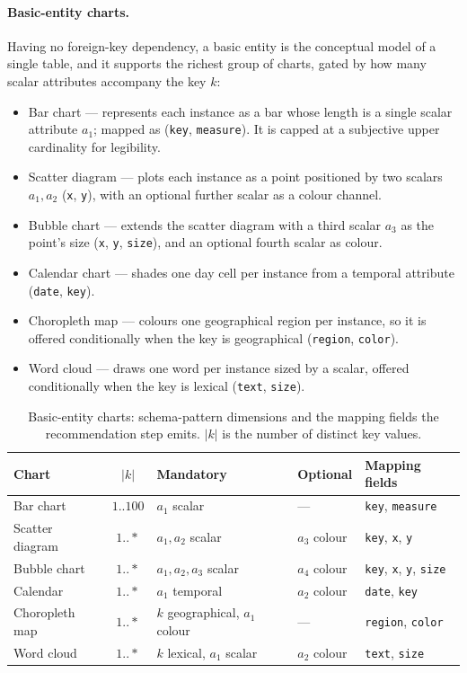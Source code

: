 \paragraph{Basic-entity charts.} Having no foreign-key dependency, a basic entity is the conceptual model of a single table, and it supports the richest group of charts, gated by how many scalar attributes accompany the key $k$:
\begin{itemize}
  \item Bar chart --- represents each instance as a bar whose length is a single scalar attribute $a_1$; mapped as (\texttt{key}, \texttt{measure}). It is capped at a subjective upper cardinality for legibility.
  \item Scatter diagram --- plots each instance as a point positioned by two scalars $a_1,a_2$ (\texttt{x}, \texttt{y}), with an optional further scalar as a colour channel.
  \item Bubble chart --- extends the scatter diagram with a third scalar $a_3$ as the point's size (\texttt{x}, \texttt{y}, \texttt{size}), and an optional fourth scalar as colour.
  \item Calendar chart --- shades one day cell per instance from a temporal attribute (\texttt{date}, \texttt{key}).
  \item Choropleth map --- colours one geographical region per instance, so it is offered conditionally when the key is geographical (\texttt{region}, \texttt{color}).
  \item Word cloud --- draws one word per instance sized by a scalar, offered conditionally when the key is lexical (\texttt{text}, \texttt{size}).
\end{itemize}

\begin{table}[htbp]
\centering
\caption{Basic-entity charts: schema-pattern dimensions and the mapping fields the recommendation step emits. $|k|$ is the number of distinct key values.}
\label{tab:step2-basic}
\small
\renewcommand{\arraystretch}{1.25}
\begin{tabular}{@{}lclll@{}}
\toprule
\textbf{Chart} & \textbf{$|k|$} & \textbf{Mandatory} & \textbf{Optional} & \textbf{Mapping fields} \\
\midrule
Bar chart & $1..100$ & $a_1$ scalar & --- & \texttt{key}, \texttt{measure} \\
Scatter diagram & $1..*$ & $a_1,a_2$ scalar & $a_3$ colour & \texttt{key}, \texttt{x}, \texttt{y} \\
Bubble chart & $1..*$ & $a_1,a_2,a_3$ scalar & $a_4$ colour & \texttt{key}, \texttt{x}, \texttt{y}, \texttt{size} \\
Calendar & $1..*$ & $a_1$ temporal & $a_2$ colour & \texttt{date}, \texttt{key} \\
Choropleth map & $1..*$ & $k$ geographical, $a_1$ colour & --- & \texttt{region}, \texttt{color} \\
Word cloud & $1..*$ & $k$ lexical, $a_1$ scalar & $a_2$ colour & \texttt{text}, \texttt{size} \\
\bottomrule
\end{tabular}
\end{table}

